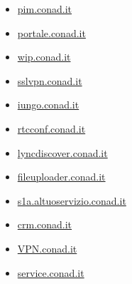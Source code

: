 \documentclass{article}
\begin{document}
\begin{itemize}
        
        
        \item \href{ https://pim.conad.it/ }{ pim.conad.it }
    
        
        
        \item \href{ https://portale.conad.it/my.policy }{ portale.conad.it }
    
        
        
        \item \href{ http://wip.conad.it/ }{ wip.conad.it }
    
        
        
        \item \href{ http://sslvpn.conad.it }{ sslvpn.conad.it }
    
        
        
        \item \href{ http://iungo.conad.it }{ iungo.conad.it }
    
        
        
        \item \href{ http://rtcconf.conad.it }{ rtcconf.conad.it }
    
        
        
        \item \href{ https://lyncdiscover.conad.it/ }{ lyncdiscover.conad.it }
    
        
        
        \item \href{ http://fileuploader.conad.it }{ fileuploader.conad.it }
    
        
        
        \item \href{ https://s1a.altuoservizio.conad.it/chiusuratemporanea.html }{ s1a.altuoservizio.conad.it }
    
        
        
        \item \href{ http://crm.conad.it }{ crm.conad.it }
    
        
        
        \item \href{ http://VPN.conad.it }{ VPN.conad.it }
    
        
        
        \item \href{ http://service.conad.it }{ service.conad.it }
    
        
        

\end{itemize}
\end{document}
